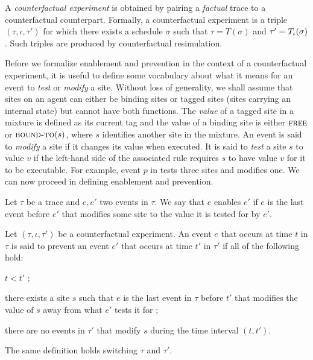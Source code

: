 A \textit{counterfactual experiment} is obtained by pairing a
\emph{factual} trace to a counterfactual counterpart. Formally, a
counterfactual experiment is a triple $(\tau, \iota, \tau')$ for which
there exists a schedule $\sigma$ such that $\tau = T(\sigma)$ and
$\tau' = {T_\iota}{}(\sigma)$. Such triples are produced by
counterfactual resimulation.

Before we formalize enablement and prevention in the context of a
counterfactual experiment, it is useful to define some vocabulary
about what it means for an event to \emph{test} or \emph{modify} a
site. Without loss of generality, we shall assume that sites on an
agent can either be binding sites or tagged sites (sites carrying an
internal state) but cannot have both functions. The \textit{value} of
a tagged site in a mixture is defined as its current tag and the value
of a binding site is either $\textsc{free}$ or $\textsc{bound-to}(s)$,
where $s$ identifies another site in the mixture.  An event is said to
\emph{modify} a site if it changes its value when executed. It is said
to \emph{test} a site $s$ to value $v$ if the left-hand side of the
associated rule requires $s$ to have value $v$ for it to be
executable. For example, event $p$ in \RefTrace{} tests three sites
and modifies one. We can now proceed in defining enablement and
prevention.



\begin{definition}[Enablement]
  Let $\tau$ be a trace and $e, e'$ two events in $\tau$.  We say that
  $e$ enables $e'$ if $e$ is the last event before $e'$ that modifies
  some site to the value it is tested for by $e'$.
\end{definition}

\begin{definition}[Prevention]
  Let $(\tau, \iota, \tau')$ be a counterfactual experiment. An event
  $e$ that occurs at time $t$ in $\tau$ is said to prevent an event
  $e'$ that occurs at time $t'$ in $\tau'$ if all of the following
  hold:
  \begin{inparaenum}[(1)]
  \item \label{inhibition:time} $t < t'$ ;
  \item \label{inhibition:breaks} there exists a site $s$ such that
    $e$ is the last event in $\tau$ before $t'$ that modifies the
    value of $s$ away from what $e'$ tests it for ;
  \item \label{inhibition:nointf} there are no events in $\tau'$ that
    modify $s$ during the time interval $(t, t')$.
  \end{inparaenum}
  The same definition holds switching $\tau$ and $\tau'$.
\end{definition}

